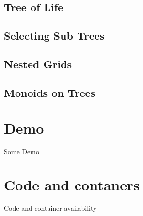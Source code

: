 \documentclass{beamer}
\begin{document}
\subsection{Tree of Life}
\begin{frame}
\begin{block}

\end{block}
\end{frame}
\subsection{Selecting Sub Trees}
\begin{frame}
\begin{block}

\end{block}
\end{frame}
\subsection{Nested Grids}
\begin{frame}
\begin{block}

\end{block}
\end{frame}
\subsection{Monoids on Trees}
\begin{frame}
\begin{block}

\end{block}
\end{frame}
\section{Demo}
\begin{frame}{Some Demo}
\begin{block}

\end{block}
\end{frame}
\section{Code and contaners}

\begin{frame}{Code and container availability}

\end{frame}
\end{document}
